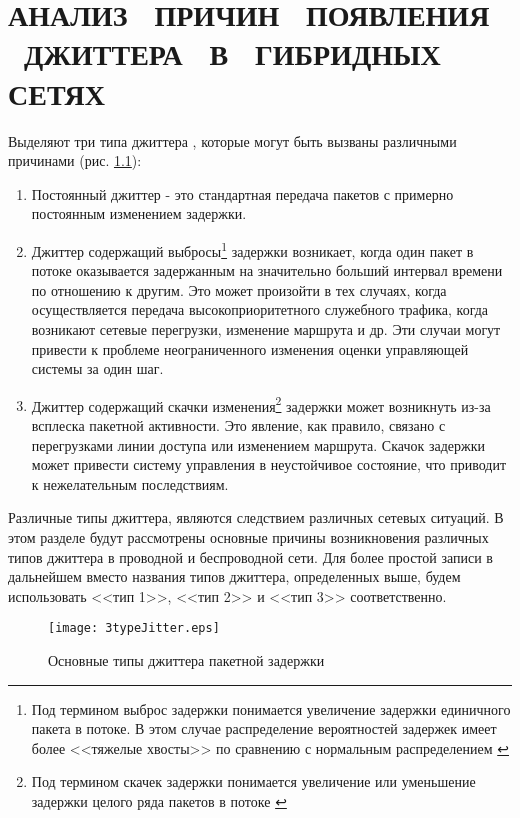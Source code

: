 \chapter{АНАЛИЗ \ ПРИЧИН \ ПОЯВЛЕНИЯ \ ДЖИТТЕРА \ В \ ГИБРИДНЫХ СЕТЯХ} \label{chapt:model}
Выделяют три типа джиттера \cite{clark}, которые могут быть вызваны различными причинами (рис. \ref{img:3typeJitter}):
\begin{enumerate}
  \item Постоянный джиттер - это стандартная передача пакетов с примерно постоянным изменением задержки.
  \item Джиттер содержащий выбросы\footnote{Под термином выброс задержки понимается увеличение задержки единичного пакета в потоке. В этом случае распределение вероятностей задержек имеет более <<тяжелые хвосты>>  по сравнению с нормальным распределением \cite{Klekis} } задержки возникает, когда один пакет в потоке оказывается задержанным на значительно больший интервал времени по отношению к другим. Это может произойти в тех случаях, когда осуществляется передача высокоприоритетного служебного трафика, когда возникают сетевые перегрузки, изменение маршрута и др. Эти случаи могут привести к проблеме неограниченного изменения оценки управляющей системы за один шаг.
  \item Джиттер содержащий скачки изменения\footnote{Под термином скачек задержки понимается увеличение или уменьшение задержки целого ряда пакетов в потоке \cite{clark} } задержки может возникнуть из-за всплеска пакетной активности. Это явление, как правило, связано с перегрузками линии доступа или изменением маршрута. Скачок задержки может привести систему управления в неустойчивое состояние, что приводит к нежелательным последствиям.
\end{enumerate}


Различные типы джиттера, являются следствием различных сетевых ситуаций. В этом разделе будут рассмотрены основные причины возникновения различных типов джиттера в проводной и беспроводной сети. Для более простой записи в дальнейшем вместо названия типов джиттера, определенных выше, будем использовать <<тип 1>>, <<тип 2>> и <<тип 3>> соответственно.

\begin{figure} [!h] 
  \center
\texttt{[image: 3typeJitter.eps]}
  \caption{Основные типы джиттера пакетной задержки} 
  \label{img:3typeJitter}  
\end{figure}


